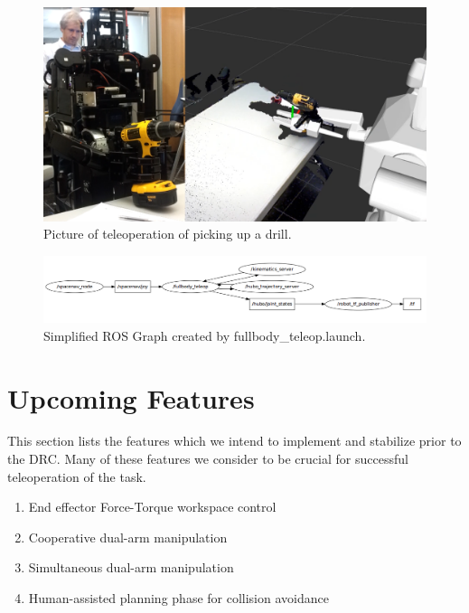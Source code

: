 \documentclass[letterpaper, 10 pt]{report}
\begin{document}
  \begin{figure}[ht]
    \centering
    \includegraphics[width=12.0cm]{figures/pickup-drill-rviz}
    \caption{Picture of teleoperation of picking up a drill.}
    \label{fig:pickup-drill-rviz-image}
  \end{figure}
  \begin{figure}[ht]
    \centering
    \includegraphics[width=12.0cm]{figures/teleop-rosgraph}
    \caption{Simplified ROS Graph created by fullbody\_teleop.launch.}
    \label{fig:teleop-rosgraph-image}
  \end{figure}



%
\pagebreak
\section{Upcoming Features}
This section lists the features which we intend to implement and stabilize prior to the DRC. Many of these
features we consider to be crucial for successful teleoperation of the task.

\begin{enumerate}
  \item End effector Force-Torque workspace control
  \item Cooperative dual-arm manipulation
  \item Simultaneous dual-arm manipulation
  \item Human-assisted planning phase for collision avoidance
\end{enumerate}
\end{document}
